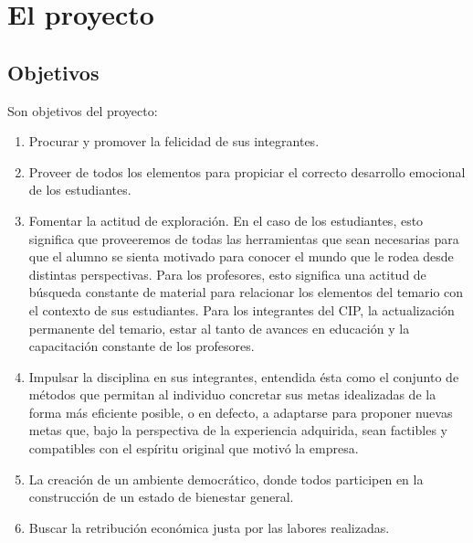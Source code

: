 \documentclass[10pt,letterpaper]{report}
\begin{document}
\section{El proyecto}

\subsection{Objetivos}
Son objetivos del proyecto:
\begin{enumerate}
\item Procurar y promover la felicidad de sus integrantes.
\item Proveer de todos los elementos para propiciar el correcto desarrollo emocional de los estudiantes.
\item Fomentar la actitud de exploración. En el caso de los estudiantes, esto significa que proveeremos de todas las herramientas que sean necesarias para que el alumno se sienta motivado para conocer el mundo que le rodea desde distintas perspectivas. Para los profesores, esto significa una actitud de búsqueda constante de material para relacionar los elementos del temario con el contexto de sus estudiantes. Para los integrantes del CIP, la actualización permanente del temario, estar al tanto de avances en educación y la capacitación constante de los profesores.
\item Impulsar la disciplina en sus integrantes, entendida ésta como el conjunto de métodos que permitan al individuo concretar sus metas idealizadas de la forma más eficiente posible, o en defecto, a adaptarse para proponer nuevas metas que, bajo la perspectiva de la experiencia adquirida, sean factibles y compatibles con el espíritu original que motivó la empresa.
\item La creación de un ambiente democrático, donde todos participen en la construcción de un estado de bienestar general.
\item Buscar la retribución económica justa por las labores realizadas.
\end{enumerate}
\end{document}

